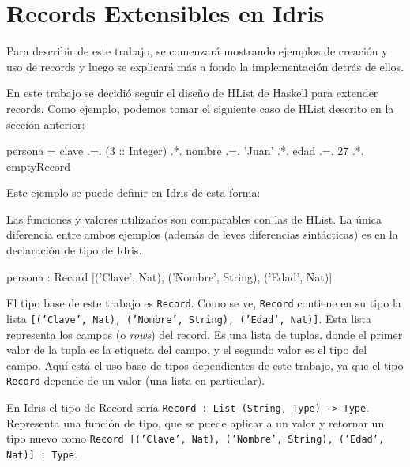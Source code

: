 
\chapter{Records Extensibles en Idris}
\label{ch:3}

Para describir de este trabajo, se comenzará mostrando ejemplos de creación y uso de records y luego se explicará más a fondo la implementación detrás de ellos.

En este trabajo se decidió seguir el diseño de HList de Haskell para extender records. Como ejemplo, podemos tomar el siguiente caso de HList descrito en la sección anterior:

\begin{code}
persona = clave .=. (3 :: Integer)
  .*. nombre .=. 'Juan'
  .*. edad .=. 27
  .*. emptyRecord
\end{code}

Este ejemplo se puede definir en Idris de esta forma:


Las funciones y valores utilizados son comparables con las de HList. La única diferencia entre ambos ejemplos (además de leves diferencias sintácticas) es en la declaración de tipo de Idris.

\begin{code}
persona : Record [('Clave', Nat), ('Nombre', String), 
  ('Edad', Nat)]
\end{code}

El tipo base de este trabajo es \texttt{Record}. Como se ve, \texttt{Record} contiene en su tipo la lista \texttt{[('Clave', Nat), ('Nombre', String), ('Edad', Nat)]}. Esta lista representa los campos (o \textit{rows}) del record. Es una lista de tuplas, donde el primer valor de la tupla es la etiqueta del campo, y el segundo valor es el tipo del campo. Aquí está el uso base de tipos dependientes de este trabajo, ya que el tipo \texttt{Record} depende de un valor (una lista en particular).

En Idris el tipo de Record sería \texttt{Record : List (String, Type) -> Type}. Representa una función de tipo, que se puede aplicar a un valor y retornar un tipo nuevo como \texttt{Record [('Clave', Nat), ('Nombre', String), ('Edad', Nat)] : Type}.

